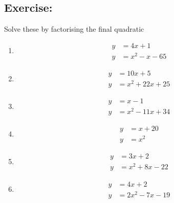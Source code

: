 \documentclass[a4paper,11pt]{article}
\begin{document}
\subsection{Exercise:}\label{ex1}
Solve these by factorising the final quadratic 
\begin{multicols}{3}
\begin{enumerate}
\item \begin{align*}
y&=4x+1\\
y&=x^{2}-x-65
\end{align*}
\item \begin{align*}
y&=10x+5\\
y&=x^{2}+22x+25
\end{align*}
\item \begin{align*}
y&=x-1\\
y&=x^{2}-11x+34
\end{align*}
\item \begin{align*}
y&=x+20\\
y&=x^{2}
\end{align*}
\item \begin{align*}
y&=3x+2\\
y&=x^{2}+8x-22
\end{align*}
\item \begin{align*}
y&=4x+2\\
y&=2x^{2}-7x-19
\end{align*}
\end{enumerate}	
\end{multicols}
\end{document}
